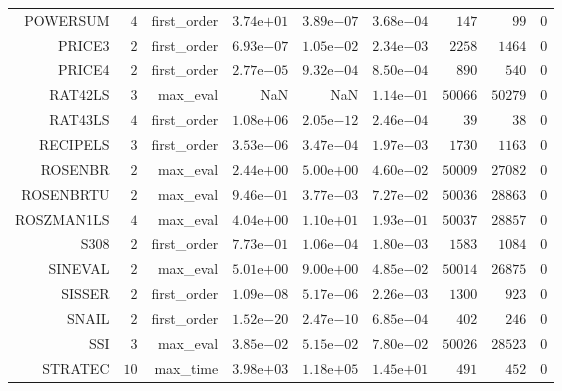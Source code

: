 \begin{longtable}{rrrrrrrrr}
POWERSUM & \(     4\) & first\_order & \( 3.74\)e\(+01\) & \( 3.89\)e\(-07\) & \( 3.68\)e\(-04\) & \(   147\) & \(    99\) & \(     0\) \\
PRICE3 & \(     2\) & first\_order & \( 6.93\)e\(-07\) & \( 1.05\)e\(-02\) & \( 2.34\)e\(-03\) & \(  2258\) & \(  1464\) & \(     0\) \\
PRICE4 & \(     2\) & first\_order & \( 2.77\)e\(-05\) & \( 9.32\)e\(-04\) & \( 8.50\)e\(-04\) & \(   890\) & \(   540\) & \(     0\) \\
RAT42LS & \(     3\) & max\_eval &       NaN &       NaN & \( 1.14\)e\(-01\) & \( 50066\) & \( 50279\) & \(     0\) \\
RAT43LS & \(     4\) & first\_order & \( 1.08\)e\(+06\) & \( 2.05\)e\(-12\) & \( 2.46\)e\(-04\) & \(    39\) & \(    38\) & \(     0\) \\
RECIPELS & \(     3\) & first\_order & \( 3.53\)e\(-06\) & \( 3.47\)e\(-04\) & \( 1.97\)e\(-03\) & \(  1730\) & \(  1163\) & \(     0\) \\
ROSENBR & \(     2\) & max\_eval & \( 2.44\)e\(+00\) & \( 5.00\)e\(+00\) & \( 4.60\)e\(-02\) & \( 50009\) & \( 27082\) & \(     0\) \\
ROSENBRTU & \(     2\) & max\_eval & \( 9.46\)e\(-01\) & \( 3.77\)e\(-03\) & \( 7.27\)e\(-02\) & \( 50036\) & \( 28863\) & \(     0\) \\
ROSZMAN1LS & \(     4\) & max\_eval & \( 4.04\)e\(+00\) & \( 1.10\)e\(+01\) & \( 1.93\)e\(-01\) & \( 50037\) & \( 28857\) & \(     0\) \\
S308 & \(     2\) & first\_order & \( 7.73\)e\(-01\) & \( 1.06\)e\(-04\) & \( 1.80\)e\(-03\) & \(  1583\) & \(  1084\) & \(     0\) \\
SINEVAL & \(     2\) & max\_eval & \( 5.01\)e\(+00\) & \( 9.00\)e\(+00\) & \( 4.85\)e\(-02\) & \( 50014\) & \( 26875\) & \(     0\) \\
SISSER & \(     2\) & first\_order & \( 1.09\)e\(-08\) & \( 5.17\)e\(-06\) & \( 2.26\)e\(-03\) & \(  1300\) & \(   923\) & \(     0\) \\
SNAIL & \(     2\) & first\_order & \( 1.52\)e\(-20\) & \( 2.47\)e\(-10\) & \( 6.85\)e\(-04\) & \(   402\) & \(   246\) & \(     0\) \\
SSI & \(     3\) & max\_eval & \( 3.85\)e\(-02\) & \( 5.15\)e\(-02\) & \( 7.80\)e\(-02\) & \( 50026\) & \( 28523\) & \(     0\) \\
STRATEC & \(    10\) & max\_time & \( 3.98\)e\(+03\) & \( 1.18\)e\(+05\) & \( 1.45\)e\(+01\) & \(   491\) & \(   452\) & \(     0\) \\

\end{longtable}
